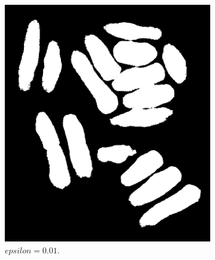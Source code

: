 \documentclass[a4paper]{article}
\begin{document}
\begin{figure}[h]
    
        \centering
        \begin{subfigure}[b]{0.25\textwidth}
                \centering
                \includegraphics[width=\textwidth]{q3-yeast-001.png}
                \caption{$epsilon=0.01$.}
                \label{fig:6a}
        \end{subfigure}
        \begin{subfigure}[b]{0.25\textwidth}
                \centering

\end{subfigure}
\end{figure}
\end{document}

